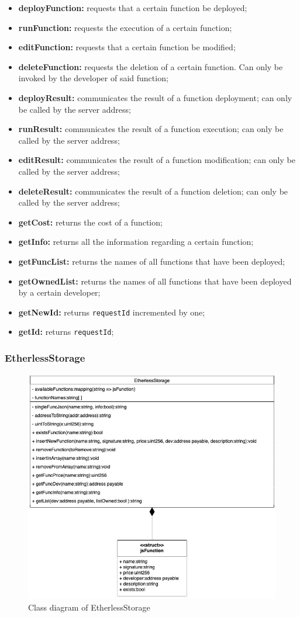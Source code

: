 	\begin{itemize}
		\item \textbf{deployFunction:} requests that a certain function be deployed;
		\item \textbf{runFunction:} requests the execution of a certain function;
		\item \textbf{editFunction:} requests that a certain function be modified;
		\item \textbf{deleteFunction:} requests the deletion of a certain function. Can only be invoked by the developer of said function;
		\item \textbf{deployResult:} communicates the result of a function deployment; can only be called by the server address;
		\item \textbf{runResult:} communicates the result of a function execution; can only be called by the server address;
		\item \textbf{editResult:} communicates the result of a function modification; can only be called by the server address;
		\item \textbf{deleteResult:} communicates the result of a function deletion; can only be called by the server address;
		\item \textbf{getCost:} returns the cost of a function;
		\item \textbf{getInfo:} returns all the information regarding a certain function;
		\item \textbf{getFuncList:} returns the names of all functions that have been deployed;
		\item \textbf{getOwnedList:} returns the names of all functions that have been deployed by a certain developer;
		\item \textbf{getNewId:} returns \texttt{requestId} incremented by one;
		\item \textbf{getId:} returns \texttt{requestId};
	\end{itemize}
		
\subsubsection{EtherlessStorage}
	\begin{figure}[H]
		\centering
		\includegraphics[width=0.6\linewidth]{diagrammi/etherless-smart/EtherlessStorage.jpg}
		\caption{Class diagram of EtherlessStorage}
	\end{figure}

